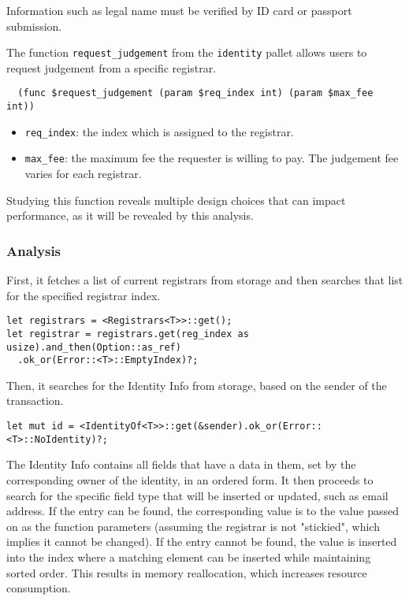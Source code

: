 \documentclass[11pt,a4paper]{article}
\begin{document}
Information such as legal name must be verified by ID card or passport
submission.
\newline

The function \verb|request_judgement| from the \verb|identity| pallet allows
users to request judgement from a specific registrar.

\begin{verbatim}
  (func $request_judgement (param $req_index int) (param $max_fee int))
\end{verbatim}

\begin{itemize}
  \item \verb|req_index|: the index which is assigned to the registrar.
  \item \verb|max_fee|: the maximum fee the requester is willing to pay. The
  judgement fee varies for each registrar.
\end{itemize}

Studying this function reveals multiple design choices that can impact
performance, as it will be revealed by this analysis.
\newline

\subsubsection{Analysis}

First, it fetches a list of current registrars from storage and then searches
that list for the specified registrar index.

\begin{verbatim}
let registrars = <Registrars<T>>::get();
let registrar = registrars.get(reg_index as usize).and_then(Option::as_ref)
  .ok_or(Error::<T>::EmptyIndex)?;
\end{verbatim}

Then, it searches for the Identity Info from storage, based on the sender of the
transaction.

\begin{verbatim}
let mut id = <IdentityOf<T>>::get(&sender).ok_or(Error::<T>::NoIdentity)?;
\end{verbatim}

The Identity Info contains all fields that have a data in them, set by the
corresponding owner of the identity, in an ordered form. It then proceeds to
search for the specific field type that will be inserted or updated, such as
email address. If the entry can be found, the corresponding value is to the
value passed on as the function parameters (assuming the registrar is not
"stickied", which implies it cannot be changed). If the entry cannot be found,
the value is inserted into the index where a matching element can be inserted
while maintaining sorted order. This results in memory reallocation, which
increases resource consumption.
\end{document}
